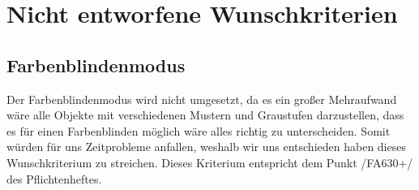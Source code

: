 \section{Nicht entworfene Wunschkriterien}

\subsection{Farbenblindenmodus}
Der Farbenblindenmodus wird nicht umgesetzt, da es ein großer Mehraufwand wäre alle Objekte mit verschiedenen Mustern und Graustufen darzustellen, dass es für einen Farbenblinden möglich wäre alles richtig zu unterscheiden.
Somit würden für uns Zeitprobleme anfallen, weshalb wir uns entschieden haben dieses Wunschkriterium zu streichen. Dieses Kriterium entspricht dem Punkt /FA630+/ des Pflichtenheftes.

